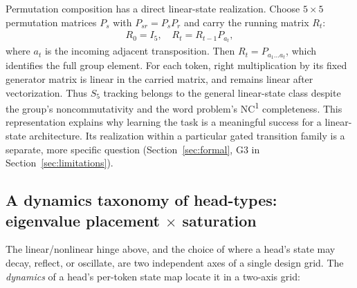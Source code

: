 \documentclass[10pt]{article}
\theoremstyle{canonical}
\theoremstyle{canonicalbullet}
\begin{document}
Permutation composition has a direct linear-state realization. Choose $5 \times  5$ permutation matrices ${P }_{s }$ with ${P }_{s  r } =  {P }_{s } {P }_{r }$ and carry the running matrix ${R }_{t }$:
\[\begin{aligned}{R }_{0} =  {I }_{5},  \quad  {R }_{t } =  {R }_{t - 1} {P }_{{a }_{t }}, \end{aligned}\]
 where ${a }_{t }$ is the incoming adjacent transposition. Then ${R }_{t } =  {P }_{{a }_{1} \ldots  {a }_{t }}$, which identifies the full group element. For each token, right multiplication by its fixed generator matrix is linear in the carried matrix, and remains linear after vectorization. Thus ${S }_{5}$ tracking belongs to the general linear-state class despite the group's noncommutativity and the word problem's NC\textsuperscript{1} completeness. This representation explains why learning the task is a meaningful success for a linear-state architecture. Its realization within a particular gated transition family is a separate, more specific question (Section~\ref{sec:formal}, G3 in Section~\ref{sec:limitations}).


\subsection*{A dynamics taxonomy of head-types: eigenvalue placement $\times $ saturation}


The linear/nonlinear hinge above, and the choice of where a head's state may decay, reflect, or oscillate, are two independent axes of a single design grid. The \emph{dynamics} of a head's per-token state map locate it in a two-axis grid:
\end{document}
